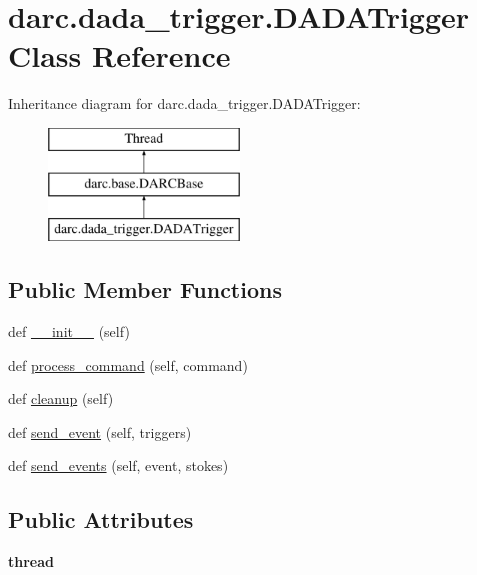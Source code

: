 \hypertarget{classdarc_1_1dada__trigger_1_1_d_a_d_a_trigger}{}\section{darc.\+dada\+\_\+trigger.\+D\+A\+D\+A\+Trigger Class Reference}
\label{classdarc_1_1dada__trigger_1_1_d_a_d_a_trigger}
Inheritance diagram for darc.\+dada\+\_\+trigger.\+D\+A\+D\+A\+Trigger\+:\begin{figure}[H]
\begin{center}
\leavevmode
\includegraphics[height=3.000000cm]{classdarc_1_1dada__trigger_1_1_d_a_d_a_trigger}
\end{center}
\end{figure}
\subsection*{Public Member Functions}
\begin{DoxyCompactItemize}
\item 
def \mbox{\hyperlink{classdarc_1_1dada__trigger_1_1_d_a_d_a_trigger_a329b9ddcd2774fda7129cbf74c9f9d5a}{\+\_\+\+\_\+init\+\_\+\+\_\+}} (self)
\item 
def \mbox{\hyperlink{classdarc_1_1dada__trigger_1_1_d_a_d_a_trigger_a1a42a6dc733db491c93058ef37e7815b}{process\+\_\+command}} (self, command)
\item 
def \mbox{\hyperlink{classdarc_1_1dada__trigger_1_1_d_a_d_a_trigger_a05f2e958d523a2a75ca37df5a59696bc}{cleanup}} (self)
\item 
def \mbox{\hyperlink{classdarc_1_1dada__trigger_1_1_d_a_d_a_trigger_ae5ba915ae331c8db0ef06667737a49a1}{send\+\_\+event}} (self, triggers)
\item 
def \mbox{\hyperlink{classdarc_1_1dada__trigger_1_1_d_a_d_a_trigger_a6762774a9b6a7d072e10ccd2e818d8cf}{send\+\_\+events}} (self, event, stokes)
\end{DoxyCompactItemize}
\subsection*{Public Attributes}
\begin{DoxyCompactItemize}
\item 
\mbox{\label{classdarc_1_1dada__trigger_1_1_d_a_d_a_trigger_a4cefd009e03bc5e3322962549f4fdee1}} 
{\bfseries thread}
\end{DoxyCompactItemize}


